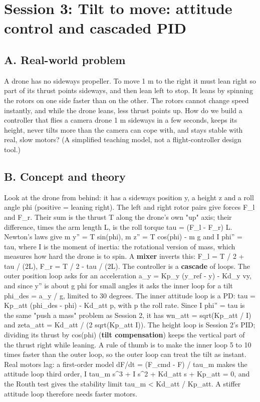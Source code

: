 \documentclass[11pt,a4paper]{article}
\begin{document}
\section{Session 3: Tilt to move: attitude control and cascaded PID}

\subsection*{A. Real-world problem}
A drone has no sideways propeller. To move 1 m to the right it must lean right so part of its thrust points sideways, and then lean left to stop. It leans by spinning the rotors on one side faster than on the other. The rotors cannot change speed instantly, and while the drone leans, less thrust points up. How do we build a controller that flies a camera drone 1 m sideways in a few seconds, keeps its height, never tilts more than the camera can cope with, and stays stable with real, slow motors? (A simplified teaching model, not a flight-controller design tool.)

\subsection*{B. Concept and theory}
Look at the drone from behind: it has a sideways position y, a height z and a roll angle phi (positive = leaning right). The left and right rotor pairs give forces F\_l and F\_r. Their sum is the thrust T along the drone's own "up" axis; their difference, times the arm length L, is the roll torque tau = (F\_l - F\_r) L. Newton's laws give m y'' = T sin(phi), m z'' = T cos(phi) - m g and I phi'' = tau, where I is the moment of inertia: the rotational version of mass, which measures how hard the drone is to spin. A \textbf{mixer} inverts this: F\_l = T / 2 + tau / (2L), F\_r = T / 2 - tau / (2L). The controller is a \textbf{cascade} of loops. The outer position loop asks for an acceleration a\_y = Kp\_y (y\_ref - y) - Kd\_y vy, and since y'' is about g phi for small angles it asks the inner loop for a tilt phi\_des = a\_y / g, limited to 30 degrees. The inner attitude loop is a PD: tau = Kp\_att (phi\_des - phi) - Kd\_att p, with p the roll rate. Since I phi'' = tau is the same "push a mass" problem as Session 2, it has wn\_att = sqrt(Kp\_att / I) and zeta\_att = Kd\_att / (2 sqrt(Kp\_att I)). The height loop is Session 2's PID; dividing its thrust by cos(phi) (\textbf{tilt compensation}) keeps the vertical part of the thrust right while leaning. A rule of thumb is to make the inner loop 5 to 10 times faster than the outer loop, so the outer loop can treat the tilt as instant. Real motors lag: a first-order model dF/dt = (F\_cmd - F) / tau\_m makes the attitude loop third order, I tau\_m s\textasciicircum{}3 + I s\textasciicircum{}2 + Kd\_att s + Kp\_att = 0, and the Routh test gives the stability limit tau\_m < Kd\_att / Kp\_att. A stiffer attitude loop therefore needs faster motors.
\end{document}
